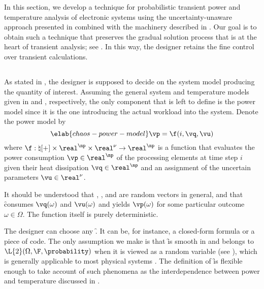 In this section, we develop a technique for probabilistic transient power and
temperature analysis of electronic systems using the uncertainty-unaware
approach presented in  combined with the machinery
described in . Our goal is to obtain such a
technique that preserves the gradual solution process that is at the heart of
transient analysis; see . In this way, the designer
retains the fine control over transient calculations.

\subsection{\problemtitle}

As stated in , the designer is supposed to
decide on the system model producing the quantity of interest. Assuming the
general system and temperature models given in  and
, respectively, the only component that is left to
define is the power model since it is the one introducing the actual workload
into the system. Denote the power model by
\begin{equation} \elab{chaos-power-model}
  \vp = \f(i, \vq, \vu)
\end{equation}
where $\f: \natural[+] \times \real^\np \times \real^\nu \to \real^\np$ is a
function that evaluates the power consumption $\vp \in \real^\np$ of the
processing elements at time step $i$ given their heat dissipation $\vq \in
\real^\np$ and an assignment of the uncertain parameters $\vu \in \real^\nu$.

\begin{remark}
It should be understood that \vp, \vq, and \vu are random vectors in general,
and that \f consumes $\vq(\omega)$ and $\vu(\omega)$ and yields $\vp(\omega)$
for some particular outcome $\omega \in \Omega$. The function itself is purely
deterministic.
\end{remark}

The designer can choose any \f. It can be, for instance, a closed-form formula
or a piece of code. The only assumption we make is that \f is smooth in \vz and
belongs to $\L{2}(\Omega, \F, \probability)$ when it is viewed as a random
variable (see ), which is generally applicable to most
physical systems \cite{xiu2010}. The definition of \f is flexible enough to take
account of such phenomena as the interdependence between power and temperature
discussed in .

